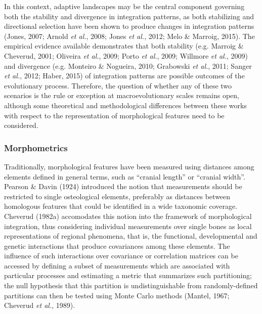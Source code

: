 \documentclass[12pt,twoside]{report}
\begin{document}
In this context, adaptive landscapes may be the central component
governing both the stability and divergence in integration patterns, as
both stabilizing and directional selection have been shown to produce
changes in integration patterns (Jones, 2007; Arnold \emph{et al.},
2008; Jones \emph{et al.}, 2012; Melo \& Marroig, 2015). The empirical
evidence available demonstrates that both stability (e.g. Marroig \&
Cheverud, 2001; Oliveira \emph{et al.}, 2009; Porto \emph{et al.}, 2009;
Willmore \emph{et al.}, 2009) and divergence (e.g. Monteiro \& Nogueira,
2010; Grabowski \emph{et al.}, 2011; Sanger \emph{et al.}, 2012; Haber,
2015) of integration patterns are possible outcomes of the evolutionary
process. Therefore, the question of whether any of these two scenarios
is the rule or exception at macroevolutionary scales remains open,
although some theoretical and methodological differences between these
works with respect to the representation of morphological features need
to be considered.

\subsubsection{Morphometrics}\label{morphometrics}

Traditionally, morphological features have been measured using distances
among elements defined in general terms, such as ``cranial length'' or
``cranial width''. Pearson \& Davin (1924) introduced the notion that
measurements should be restricted to single osteological elements,
preferably as distances between homologous features that could be
identified in a wide taxonomic coverage. Cheverud (1982a) accomodates
this notion into the framework of morphological integration, thus
considering individual measurements over single bones as local
representations of regional phenomena, that is, the functional,
developmental and genetic interactions that produce covariances among
these elements. The influence of such interactions over covariance or
correlation matrices can be accessed by defining a subset of
measurements which are associated with particular processes and
estimating a metric that summarizes such partitioning; the null
hypothesis that this partition is undistinguishable from
randomly-defined partitions can then be tested using Monte Carlo methods
(Mantel, 1967; Cheverud \emph{et al.}, 1989).
\end{document}
